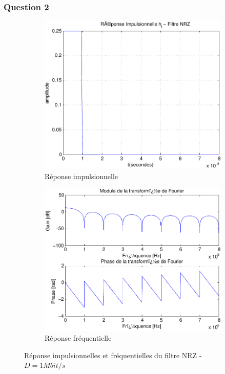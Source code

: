 \documentclass[a4paper,11pt]{article}
\begin{document}
\subsubsection*{Question 2}
\begin{figure}
	\begin{subfigure}{.5\textwidth}
  		\centering
  		\includegraphics[width=1\linewidth]{impul_nrz-crop.pdf}
  		\caption{Réponse impulsionnelle}
  		\label{fig:nrz_impul1M}
	\end{subfigure}
	\begin{subfigure}{.5\textwidth}
  		\centering
  		\includegraphics[width=1\linewidth]{frec_nrz-crop.pdf}
  		\caption{Réponse fréquentielle}
  		\label{fig:nrz_frec1M}
	\end{subfigure}%
	\caption{Réponse impulsionnelles et fréquentielles du filtre NRZ - $D=1 Mbit/s$}
	\label{fig:nrz1M}
\end{figure} 
\end{document}
